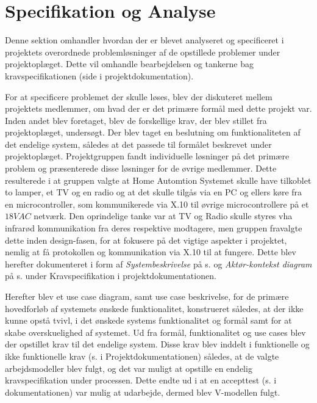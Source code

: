 \section{Specifikation og Analyse}
Denne sektion omhandler hvordan der er blevet analyseret og specificeret i projektets overordnede problemløsninger af de opstillede problemer under projektoplæget. 
Dette vil omhandle bearbejdelsen og tankerne bag kravspecifikationen (side \pageref{P-chap:kravspec} i projektdokumentation).

For at specificere problemet der skulle løses, blev der diskuteret mellem projektets medlemmer, om hvad der er det primære formål med dette projekt var. 
Inden andet blev foretaget, blev de forskellige krav, der blev stillet fra projektoplæget, undersøgt. 
Der blev taget en beslutning om funktionaliteten af det endelige system, således at det passede til formålet beskrevet under projektoplæget. 
Projektgruppen fandt individuelle løsninger på det primære problem og præsenterede disse løsninger for de øvrige medlemmer. 
Dette resulterede i at gruppen valgte at Home Automtion Systemet skulle have tilkoblet to lamper, et TV og en radio og at det skulle tilgås via en PC og ellers køre fra en microcontroller, som kommunikerede via X.10\cite{lib:AN236} til øvrige microcontrollere på et $18V AC$ netværk. 
Den oprindelige tanke var at TV og Radio skulle styres vha infrarød kommunikation fra deres respektive modtagere, men gruppen fravalgte dette inden design-fasen, for at fokusere på det vigtige aspekter i projektet, nemlig at få protokollen og kommunikation via X.10 til at fungere.
Dette blev herefter dokumenteret i form af \textit{Systembeskrivelse} på s. \pageref{P-Systembeskrivelse} og \textit{Aktør-kontekst diagram} på s. \pageref{P-fig:actor} under Kravspecifikation i projektdokumentationen.

Herefter blev et use case diagram, samt use case beskrivelse, for de primære hovedforløb af systemets ønskede funktionalitet, konstrueret således, at der ikke kunne opstå tvivl, i det ønskede systems funktionalitet og formål samt for at skabe overskuelighed af systemet. 
Ud fra formål, funktionalitet og use cases blev der opstillet krav til det endelige system. 
Disse krav blev inddelt i funktionelle og ikke funktionelle krav (s. \pageref{P-FunkKrav} i Projektdokumentationen) således, at de valgte arbejdsmodeller blev fulgt, og det var muligt at opstille en endelig kravspecifikation under processen. 
Dette endte ud i at en accepttest (s. \pageref{P-chap:acceptt} i dokumentationen) var mulig at udarbejde, dermed blev V-modellen fulgt.